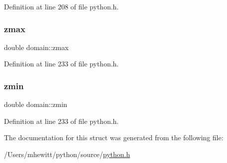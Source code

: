 Definition at line 208 of file python.\+h.

\mbox{\label{structdomain_a411d6f66a03156ee0a5870688d0a9719}} 
\subsubsection{\texorpdfstring{zmax}{zmax}}
{\footnotesize\ttfamily double domain\+::zmax}



Definition at line 233 of file python.\+h.

\mbox{\label{structdomain_ab879cd1aeb9b7e657b17a12ea2020a1a}} 
\subsubsection{\texorpdfstring{zmin}{zmin}}
{\footnotesize\ttfamily double domain\+::zmin}



Definition at line 233 of file python.\+h.



The documentation for this struct was generated from the following file\+:\begin{DoxyCompactItemize}
\item 
/\+Users/mhewitt/python/source/\hyperlink{python_8h}{python.\+h}\end{DoxyCompactItemize}
